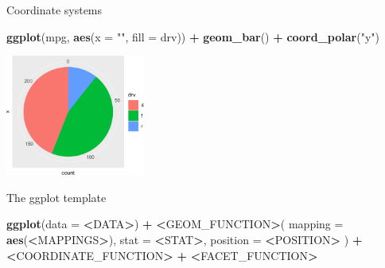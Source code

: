\documentclass[ignorenonframetext,]{beamer}
\newenvironment{Shaded}{\begin{snugshade}}{\end{snugshade}}
\newcommand{\DataTypeTok}[1]{\textcolor[rgb]{0.13,0.29,0.53}{#1}}
\newcommand{\ErrorTok}[1]{\textcolor[rgb]{0.64,0.00,0.00}{\textbf{#1}}}
\newcommand{\KeywordTok}[1]{\textcolor[rgb]{0.13,0.29,0.53}{\textbf{#1}}}
\newcommand{\NormalTok}[1]{#1}
\newcommand{\OperatorTok}[1]{\textcolor[rgb]{0.81,0.36,0.00}{\textbf{#1}}}
\newcommand{\StringTok}[1]{\textcolor[rgb]{0.31,0.60,0.02}{#1}}
\begin{document}
\begin{frame}[fragile]{Coordinate systems}
\protect\hypertarget{coordinate-systems-4}{}

\begin{Shaded}
\begin{Highlighting}[]
\KeywordTok{ggplot}\NormalTok{(mpg, }\KeywordTok{aes}\NormalTok{(}\DataTypeTok{x =} \StringTok{""}\NormalTok{, }\DataTypeTok{fill =}\NormalTok{ drv)) }\OperatorTok{+}
\StringTok{  }\KeywordTok{geom_bar}\NormalTok{() }\OperatorTok{+}
\StringTok{  }\KeywordTok{coord_polar}\NormalTok{(}\StringTok{"y"}\NormalTok{)}
\end{Highlighting}
\end{Shaded}

\begin{center}\includegraphics[height=150px]{data-visualization_files/figure-beamer/unnamed-chunk-145-1} \end{center}

\end{frame}

\begin{frame}[fragile]{The ggplot template}
\protect\hypertarget{the-ggplot-template}{}

\begin{Shaded}
\begin{Highlighting}[]
\KeywordTok{ggplot}\NormalTok{(}\DataTypeTok{data =} \OperatorTok{<}\NormalTok{DATA}\OperatorTok{>}\NormalTok{) }\OperatorTok{+}\StringTok{ }
\StringTok{  }\ErrorTok{<}\NormalTok{GEOM_FUNCTION}\OperatorTok{>}\NormalTok{(}
     \DataTypeTok{mapping =} \KeywordTok{aes}\NormalTok{(}\OperatorTok{<}\NormalTok{MAPPINGS}\OperatorTok{>}\NormalTok{),}
     \DataTypeTok{stat =} \OperatorTok{<}\NormalTok{STAT}\OperatorTok{>}\NormalTok{, }
     \DataTypeTok{position =} \OperatorTok{<}\NormalTok{POSITION}\OperatorTok{>}
\StringTok{  }\NormalTok{) }\OperatorTok{+}
\StringTok{  }\ErrorTok{<}\NormalTok{COORDINATE_FUNCTION}\OperatorTok{>}\StringTok{ }\OperatorTok{+}
\StringTok{  }\ErrorTok{<}\NormalTok{FACET_FUNCTION}\OperatorTok{>}
\end{Highlighting}
\end{Shaded}

\end{frame}
\end{document}
